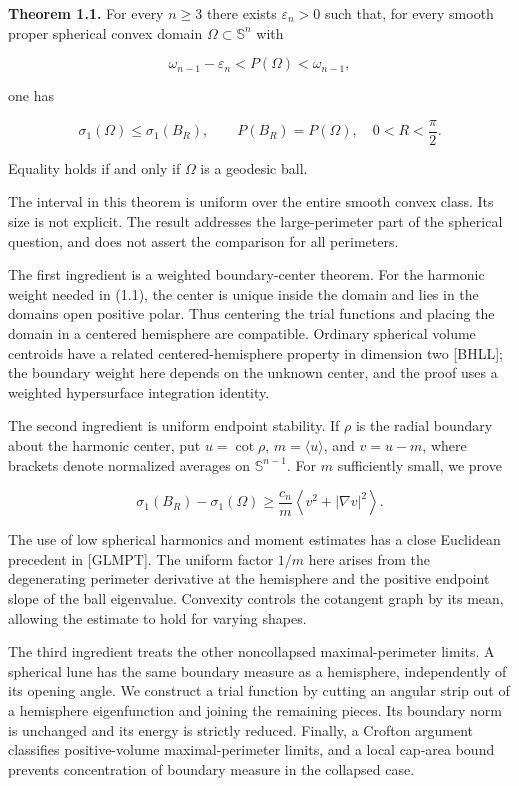\documentclass[11pt]{article}
\begin{document}
\textbf{Theorem 1.1.} For every \(n\geq3\) there exists
\(\varepsilon_n>0\) such that, for every smooth proper spherical convex
domain \(\Omega\subset\mathbb S^n\) with

\[
\omega_{n-1}-\varepsilon_n<P(\Omega)<\omega_{n-1},
\tag{1.2}
\]

one has

\[
\sigma_1(\Omega)\leq\sigma_1(B_R),\qquad
P(B_R)=P(\Omega),\quad 0<R<\frac{\pi}{2}.
\tag{1.3}
\]

Equality holds if and only if \(\Omega\) is a geodesic ball.

The interval in this theorem is uniform over the entire smooth convex
class. Its size is not explicit. The result addresses the
large-perimeter part of the spherical question, and does not assert the
comparison for all perimeters.

The first ingredient is a weighted boundary-center theorem. For the
harmonic weight needed in (1.1), the center is unique inside the domain
and lies in the domain\textquotesingle s open positive polar. Thus
centering the trial functions and placing the domain in a centered
hemisphere are compatible. Ordinary spherical volume centroids have a
related centered-hemisphere property in dimension two {[}BHLL{]}; the
boundary weight here depends on the unknown center, and the proof uses a
weighted hypersurface integration identity.

The second ingredient is uniform endpoint stability. If \(\rho\) is the
radial boundary about the harmonic center, put \(u=\cot\rho\),
\(m=\langle u\rangle\), and \(v=u-m\), where brackets denote normalized
averages on \(\mathbb S^{n-1}\). For \(m\) sufficiently small, we prove

\[
\sigma_1(B_R)-\sigma_1(\Omega)
\geq \frac{c_n}{m}
\left\langle v^2+|\nabla v|^2\right\rangle.
\tag{1.4}
\]

The use of low spherical harmonics and moment estimates has a close
Euclidean precedent in {[}GLMPT{]}. The uniform factor \(1/m\) here
arises from the degenerating perimeter derivative at the hemisphere and
the positive endpoint slope of the ball eigenvalue. Convexity controls
the cotangent graph by its mean, allowing the estimate to hold for
varying shapes.

The third ingredient treats the other noncollapsed maximal-perimeter
limits. A spherical lune has the same boundary measure as a hemisphere,
independently of its opening angle. We construct a trial function by
cutting an angular strip out of a hemisphere eigenfunction and joining
the remaining pieces. Its boundary norm is unchanged and its energy is
strictly reduced. Finally, a Crofton argument classifies positive-volume
maximal-perimeter limits, and a local cap-area bound prevents
concentration of boundary measure in the collapsed case.
\end{document}
